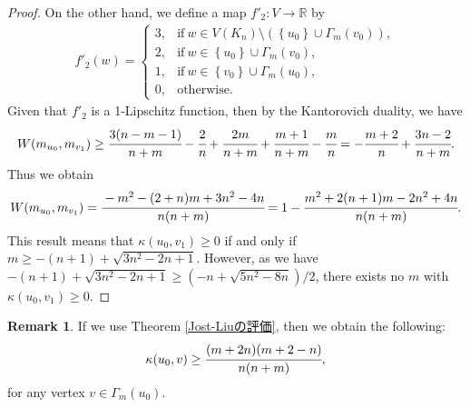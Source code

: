 \documentclass[leqno,12pt]{amsart} %
\theoremstyle{plain} %
\theoremstyle{definition} %
\newtheorem{remark}[theorem]{\indent\sc Remark}
\begin{document}
\begin{proof}
On the other hand, we define a map $f'_2 : V \to \mathbb{R}$ by
\begin{eqnarray*}
f'_2 (w)=
\begin{cases}
3, & \mathrm{if}\ w \in V(K_n) \setminus (\left\{u_{0} \right\} \cup \Gamma_m (v_0)),\\
2, & \mathrm{if}\ w \in \left\{u_{0} \right\} \cup \Gamma_m (v_0),\\
1, & \mathrm{if}\ w \in \left\{v_{0} \right\} \cup \Gamma_m (u_0),\\
0, & \mathrm{otherwise}.
\end{cases}
\end{eqnarray*}
Given that $f'_2$ is a 1-Lipschitz function, then by the Kantorovich duality, we have
\begin{eqnarray*}
W(m_{u_0}, m_{v_1}) \geq  \cfrac{3(n-m-1)}{n+m} - \cfrac{2}{n} + \cfrac{2m}{n+m} + \cfrac{m+1}{n+m} - \cfrac{m}{n}= - \cfrac{m+2}{n} +\cfrac{3n-2}{n+m}.
\end{eqnarray*}
Thus we obtain
\begin{eqnarray*}
W(m_{u_0}, m_{v_1})  =  \cfrac{-m^2 - (2+n)m +3n^2 -4n}{n(n+m)} = 1- \cfrac{m^2 + 2(n+1)m - 2n^2 +4n}{n(n+m)}.
\end{eqnarray*}
This result means that $\kappa (u_0, v_1) \geq 0$ if and only if $m \geq -(n+1) + \sqrt{3n^2 - 2n +1}$. However, as we have $-(n+1) + \sqrt{3n^2 - 2n +1} \geq (-n + \sqrt{5n^2 -8n})/2$, there exists no $m$ with $\kappa (u_0, v_1) \geq 0$.
\end{proof}
\begin{remark}
\label{example2}
If we use Theorem \ref{Jost-Liuの評価}, then we obtain the following:
\begin{eqnarray*}
\kappa(u_0, v) \geq \cfrac{(m+2n)(m+2-n)}{n(n+m)},
\end{eqnarray*}
for any vertex $v \in \Gamma_m (u_0)$. 
\end{remark}
\end{document}
